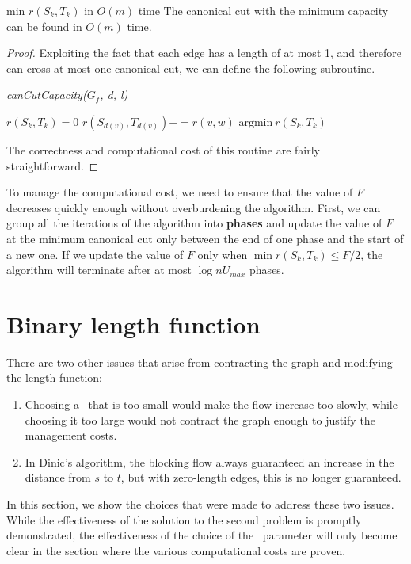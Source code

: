     \begin{lemma}{min $r(S_k,T_k)$ in $O(m)$ time}{}
        The canonical cut with the minimum capacity can be found in $O(m)$ time.
    \end{lemma}
    \begin{proof}

        Exploiting the fact that each edge has a length of at most 1, and therefore can cross at most one canonical cut, we can define the following subroutine.
        \begin{algorithm}[H]
            \caption{\textit{canCutCapacity($G_f$, d, l)}}
            \label{canCutCapacity}
            \begin{algorithmic}[1]
                  $r(S_k,T_k) = 0$
                \EndFor
                   $r(S_{d(v)},T_{d(v)}) += r(v,w)$\EndIf
                \EndFor
                \State\Return  $\text{argmin}\ r(S_k,T_k)$
            \end{algorithmic}
        \end{algorithm}
    The correctness and computational cost of this routine are fairly straightforward.
    \end{proof}

    To manage the computational cost, we need to ensure that the value of $F$ decreases quickly enough without overburdening the algorithm.  
    First, we can group all the iterations of the algorithm into \textbf{phases} and update the value of $F$ at the minimum canonical cut only between the end of one phase and the start of a new one. If we update the value of $F$ only when $\min r(S_k, T_k) \leq F/2$, the algorithm will terminate after at most $\log nU_{max}$ phases.

\section{Binary length function}
    There are two other issues that arise from contracting the graph and modifying the length function:
    \begin{enumerate}
        \item Choosing a \dlt\ that is too small would make the flow increase too slowly, while choosing it too large would not contract the graph enough to justify the management costs.
        \item In Dinic's algorithm, the blocking flow always guaranteed an increase in the distance from $s$ to $t$, but with zero-length edges, this is no longer guaranteed.

    \end{enumerate}
    In this section, we show the choices that were made to address these two issues. While the effectiveness of the solution to the second problem is promptly demonstrated, the effectiveness of the choice of the \dlt\  parameter will only become clear in the section where the various computational costs are proven.
